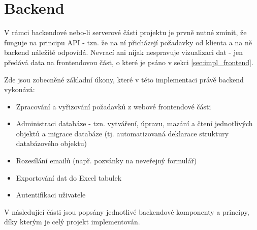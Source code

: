 \section{Backend}\label{sec:impl_backend}
	V rámci backendové nebo-li serverové části projektu je prvně nutné zmínit, že funguje na principu API - tzn. že na ní přicházejí požadavky od klienta a na ně backend náležitě odpovídá. Nevrací ani nijak nespravuje vizualizaci dat - jen předává data na frontendovou část, o které je psáno v sekci \ref{sec:impl_frontend}.
	
	Zde jsou zobecněné základní úkony, které v této implementaci právě backend vykonává:
	
	\begin{itemize}
		\item Zpracování a vyřizování požadavků z webové frontendové části
		\item Administraci databáze - tzn. vytváření, úpravu, mazání a čtení jednotlivých objektů a migrace databáze (tj. automatizovaná deklarace struktury databázového objektu)
		\item Rozesílání emailů (např. pozvánky na neveřejný formulář)
		\item Exportování dat do Excel tabulek
		\item Autentifikaci uživatele
	\end{itemize}
	 
	V následující části jsou popsány jednotlivé backendové komponenty a principy, díky kterým je celý projekt implementován.
	

